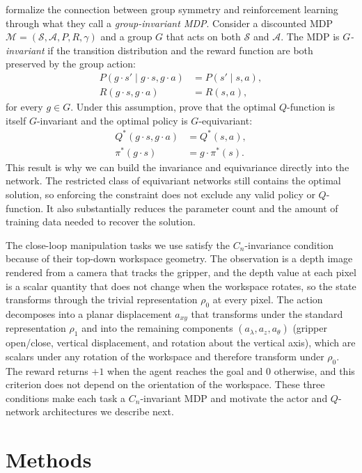\documentclass[letterpaper]{article}
\begin{document}
\citet{wang2022so2} formalize the connection between group symmetry and reinforcement learning through what they call a \emph{group-invariant MDP}. Consider a discounted MDP $\mathcal{M} = (\mathcal{S}, \mathcal{A}, P, R, \gamma)$ and a group $G$ that acts on both $\mathcal{S}$ and $\mathcal{A}$. The MDP is \emph{$G$-invariant} if the transition distribution and the reward function are both preserved by the group action:
\begin{align}
P(g \cdot s' \mid g \cdot s, g \cdot a) &= P(s' \mid s, a), \\
R(g \cdot s, g \cdot a) &= R(s, a),
\end{align}
for every $g \in G$. Under this assumption, \citet[Section~4]{wang2022so2} prove that the optimal $Q$-function is itself $G$-invariant and the optimal policy is $G$-equivariant:
\begin{align}
Q^*(g \cdot s, g \cdot a) &= Q^*(s, a), \\
\pi^*(g \cdot s) &= g \cdot \pi^*(s).
\end{align}
This result is why we can build the invariance and equivariance directly into the network. The restricted class of equivariant networks still contains the optimal solution, so enforcing the constraint does not exclude any valid policy or $Q$-function. It also substantially reduces the parameter count and the amount of training data needed to recover the solution.

The close-loop manipulation tasks we use satisfy the $C_n$-invariance condition because of their top-down workspace geometry. The observation is a depth image rendered from a camera that tracks the gripper, and the depth value at each pixel is a scalar quantity that does not change when the workspace rotates, so the state transforms through the trivial representation $\rho_0$ at every pixel. The action decomposes into a planar displacement $a_{xy}$ that transforms under the standard representation $\rho_1$ and into the remaining components $(a_\lambda, a_z, a_\theta)$ (gripper open/close, vertical displacement, and rotation about the vertical axis), which are scalars under any rotation of the workspace and therefore transform under $\rho_0$. The reward returns $+1$ when the agent reaches the goal and $0$ otherwise, and this criterion does not depend on the orientation of the workspace. These three conditions make each task a $C_n$-invariant MDP and motivate the actor and $Q$-network architectures we describe next.


\section{Methods}
\end{document}
